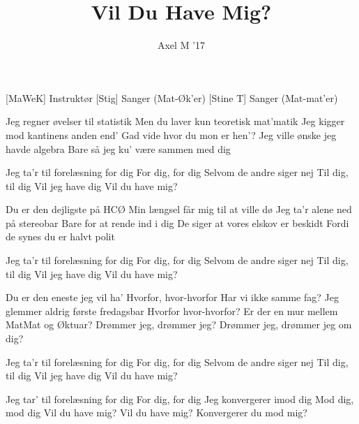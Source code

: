 \documentclass[a4paper,11pt]{article}
\title{Vil Du Have Mig?}
\author{Axel M '17}
\begin{document}
\maketitle

\begin{roles}
[MaWeK] Instruktør
[Stig] Sanger (Mat-Øk'er)
[Stine T] Sanger (Mat-mat'er)
\end{roles}

\begin{song}
 Jeg regner øvelser til statistik
Men du laver kun teoretisk mat'matik
Jeg kigger mod kantinens anden end'
Gad vide hvor du mon er hen'?
Jeg ville ønske jeg havde algebra
Bare så jeg ku' være sammen med dig

 Jeg ta'r til forelæsning for dig
For dig, for dig
Selvom de andre siger nej
Til dig, til dig
Vil jeg have dig
 Vil du have mig?

 Du er den dejligste på HCØ
Min længsel får mig til at ville dø
Jeg ta'r alene ned på stereobar
Bare for at rende ind i dig
De siger at vores elskov er beskidt
Fordi de synes du er halvt polit

 Jeg ta'r til forelæsning for dig
For dig, for dig
Selvom de andre siger nej
Til dig, til dig
Vil jeg have dig
Vil du have mig?

 Du er den eneste jeg vil ha'
 Hvorfor, hvor-hvorfor
 Har vi ikke samme fag?
 Jeg glemmer aldrig første fredagsbar
 Hvorfor hvor-hvorfor?
Er der en mur mellem MatMat og Øktuar?
Drømmer jeg, drømmer jeg?
Drømmer jeg, drømmer jeg om dig?

 Jeg ta'r til forelæsning for dig
For dig, for dig
Selvom de andre siger nej
Til dig, til dig
Vil jeg have dig
Vil du have mig?

 Jeg tar' til forelæsning for dig
For dig, for dig
Jeg konvergerer imod dig
Mod dig, mod dig
Vil du have mig?
Vil du have mig?
Konvergerer du mod mig?
\end{song}
\end{document}
